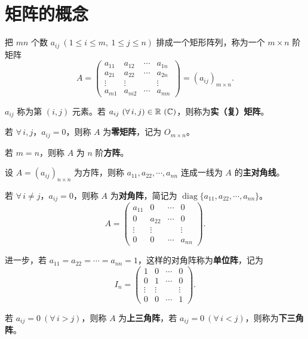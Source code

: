 \section{矩阵的概念}

\begin{definition}%
把 $mn$ 个数 $a_{ij}\ (1\le i\le m,\ 1\le j\le n)$ 排成一个矩形阵列，称为一个 $m\times n$ 阶矩阵
\[
A=
\begin{pmatrix}
a_{11} & a_{12} & \cdots & a_{1n}\\
a_{21} & a_{22} & \cdots & a_{2n}\\
\vdots & \vdots & & \vdots\\
a_{m1} & a_{m2} & \cdots & a_{mn}
\end{pmatrix}
=(a_{ij})_{m\times n}.
\]

$a_{ij}$ 称为第 $(i,j)$ 元素。若 $a_{ij}\ (\forall\,i,j)\in\R\ (\C)$，则称为\textbf{实（复）矩阵}。

若 $\forall\,i,j$，$a_{ij}=0$，则称 $A$ 为\textbf{零矩阵}，记为 $O_{m\times n}$。

若 $m=n$，则称 $A$ 为 $n$ 阶\textbf{方阵}。

设 $A=(a_{ij})_{n\times n}$ 为方阵，则称 $a_{11},a_{22},\cdots,a_{nn}$ 连成一线为 $A$ 的\textbf{主对角线}。

若 $\forall\,i\neq j$，$a_{ij}=0$，则称 $A$ 为\textbf{对角阵}，简记为 $\operatorname{diag}\{a_{11},a_{22},\cdots,a_{nn}\}$。
\[
A=
\begin{pmatrix}
a_{11} & 0 & \cdots & 0\\
0 & a_{22} & \cdots & 0\\
\vdots & \vdots & & \vdots\\
0 & 0 & \cdots & a_{nn}
\end{pmatrix}.
\]

进一步，若 $a_{11}=a_{22}=\cdots=a_{nn}=1$，这样的对角阵称为\textbf{单位阵}，记为
\[
I_n=
\begin{pmatrix}
1 & 0 & \cdots & 0\\
0 & 1 & \cdots & 0\\
\vdots & \vdots & & \vdots\\
0 & 0 & \cdots & 1
\end{pmatrix}.
\]

若 $a_{ij}=0\ (\forall\,i>j)$，则称 $A$ 为\textbf{上三角阵}，若 $a_{ij}=0\ (\forall\,i<j)$，则称为\textbf{下三角阵}。
\end{definition}

